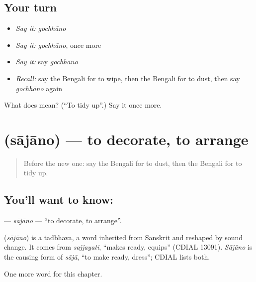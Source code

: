 \subsection*{Your turn}
\begin{itemize}
\raggedright
  \item \emph{Say it:} \emph{gochhāno}
  \item \emph{Say it:} \emph{gochhāno}, once more
  \item \emph{Say it:} say \emph{gochhāno}
  \item \emph{Recall:} say the Bengali for to wipe, then the Bengali for to dust, then say \emph{gochhāno} again
\end{itemize}

\begin{tcolorbox}[breakable,colback=teal!4,colframe=teal!35!black,title={Before you move on}]
What does  mean? (\textquotedblleft{}To tidy up\textquotedblright{}.) Say it once more.
\end{tcolorbox}
\section[\texorpdfstring{\bn{সাজানো} (sājāno)}{সাজানো (sājāno)}]{ (sājāno) — to decorate, to arrange}

\label{lesson:BN-C105-sajano}



\begin{quote}
Before the new one: say the Bengali for to dust, then the Bengali for to tidy up.
\end{quote}

\subsection*{You'll want to know: }
\textbf{} — \emph{sājāno} — \textquotedblleft{}to decorate, to arrange\textquotedblright{}.

\begin{cousinweb}
\textbf{} (\emph{sājāno}) is a tadbhava, a word inherited from Sanskrit and reshaped by sound change. It comes from \emph{sajjayati}, \textquotedblleft{}makes ready, equips\textquotedblright{} (CDIAL 13091). \emph{Sājāno} is the causing form of \emph{sājā}, \textquotedblleft{}to make ready, dress\textquotedblright{}; CDIAL lists both.
\end{cousinweb}

\begin{grammarlens}[title={What you've built}]
One more word for this chapter.
\end{grammarlens}

